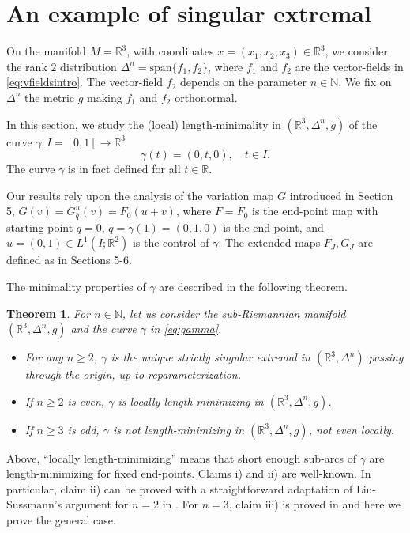 \documentclass[12pt, reqno]{amsart}
\theoremstyle{plain}
\newtheorem {theorem}{Theorem}[section]
\theoremstyle{definition}
\theoremstyle{remark}
\numberwithin{equation}{section}
\newcommand{\R}{\mathbb{R}}
\newcommand{\N}{\mathbb{N}}
\newcommand{\0}{\theta}
\newcommand{\g}{\gamma}
\newcommand{\De}{\Delta}
\newcommand{\1}{{-1}}
\newcommand{\q}{\bar q}
\newcommand{\m}{n}
\renewcommand{\=}{\coloneqq}
\renewcommand{\.}{\dots}
\newcommand{\mr}{\mathrm}
\begin{document}
 
 

\section{An example of singular extremal} 

On the manifold $M=\R^3$, with coordinates  $x=(x_1,x_2,x_3)\in\R^3$,
we consider the rank $2$ distribution  $\De^n=\mr{span}\{f_1,f_2\}$,
where $f_1$ and $f_2$ are the vector-fields in \eqref{eq:vfieldsintro}. 
The vector-field $f_2$ depends on the parameter 
 $n\in\N$. We fix on $\De^n$ 
 the metric $g$ making $f_1$ and $f_2$ orthonormal.


In this section, we study the (local) length-minimality in $(\R^3,\De^n,g)$ of the curve
$  \g:I= [0,1]  \to\R^3$
\begin{equation}
 \label{eq:gamma} \gamma(t)=  (0,t,0), \quad t\in I. 
 \end{equation}
The curve $\g$ is in fact defined for all $t\in\R$.

Our results rely upon  the analysis of the variation map $G$  introduced in Section 5,  $G(v)=G_{\q}^u(v)=F_0(u+v)$, where $F=F_0$ is the end-point map with starting point $q=0$,  $\q =\g(1)=(0,1,0)$ is the end-point, and $u=(0,1)\in L^1(I;\R^2)$ is the control of $\g$.
The extended maps $F_J,G_J$ are   defined as in Sections 5-6.


The minimality properties of $\g$ are described in the following theorem.

\begin{theorem} 
\label{teoes}
For $n\in\N$, let us consider the sub-Riemannian manifold $(\R^3,\De^n,g)$ and the curve $\g$ in \eqref{eq:gamma}.
\begin{itemize}
 \item[i)] For any $\m\geq2$, $\g$ is the unique  strictly singular extremal in $(\R^3,\Delta^n)$
passing through the origin,
up to reparameterization. 

\item[ii)] If $\m\geq 2$ is even,   $\g$ is locally length-minimizing in $(\R^3,\De^n,g)$.
\item[iii)] If $\m\geq 3$ is odd,   $\g$ is not  length-minimizing in $(\R^3,\De^n,g)$, not even locally.
\end{itemize}
\end{theorem}

Above, \enquote{locally length-minimizing} means that short {\color{black} enough}   sub-arcs of $\g$ are length-minimizing for fixed end-points.
Claims i) and ii) are well-known. In particular, claim ii) can be proved with a straightforward adaptation of Liu-Sussmann's argument for $n=2$ in \cite{LS95}.  For $\m=3$, claim iii) is proved in  \cite{BMP20} and here we prove the general case.
\end{document}
